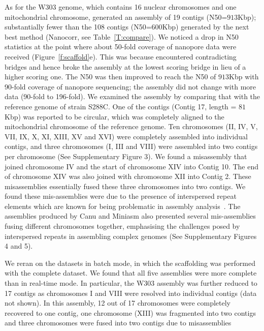 As for the \sce{} W303 genome, which contains 16 nuclear chromosomes and one 
mitochondrial chromosome, \npscarf{} generated an assembly of 19 contigs (N50=$913$Kbp); 
substantially fewer than 
the 108 contigs (N50=$600$Kbp) generated by the next best method (Nanocorr, 
see Table~\ref{T:compare}).
We noticed a drop in N50 statistics at the point where about 50-fold coverage 
of nanopore data were received (Figure~\ref{f:scaffold}e). This was because
\npscarf{} encountered contradicting bridges and hence broke the assembly at 
the lowest scoring bridge in lieu of a higher scoring one. The N50 was then 
improved to reach the N50 of $913$Kbp with 90-fold coverage of nanopore sequencing; 
the assembly did not change with more data (90-fold to 196-fold). 
We examined the assembly by comparing that with the reference genome of \sce{}
strain S288C. One of the contigs (Contig 17,
length = $81$Kbp) was reported to be circular, which was completely aligned to the 
mitochondrial chromosome of the reference genome. Ten chromosomes (II,
IV, V, VII, IX, X, XI, XIII, XV and XVI) were completely assembled into individual
contigs, and three chromosomes (I, III and VIII) were assembled into two contigs per 
chromosome (See Supplementary Figure 3). We found a misassembly that joined
chromosome IV and the start of chromosome XIV into Contig 10. The end of
chromosome XIV was also joined with chromosome XII into Contig 2. These
misassemblies essentially fused these three chromosomes into two contigs.
We found these mis-assemblies were due to the presence of interspersed repeat
elements which are known for being problematic in assembly
analysis~\cite{TreangenS2012}. The assemblies produced by Canu and Miniasm also
presented several mis-assemblies fusing different chromosomes together, 
emphasising the challenges posed by interspersed repeats in assembling complex 
genomes (See Supplementary Figures 4 and 5).


We reran \npscarf{} on the datasets in batch mode, in which the scaffolding was
performed with the complete dataset. We found that all five assemblies were  
more complete than in real-time mode. In particular, the \sce{} W303
assembly was further reduced to 17 contigs as chromosomes I and VIII were 
resolved into individual contigs (data not shown). In this assembly, 12 out of
17 chromosomes were completely recovered to one contig, one chromosome (XIII)
was fragmented into two contigs and three chromosomes were fused into two
contigs due to misassemblies


